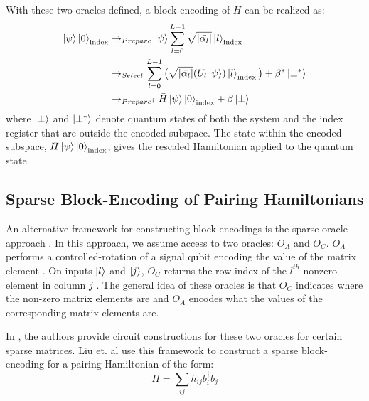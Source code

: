 With these two oracles defined, a block-encoding of $H$ can be realized as:
\begin{equation}
    \begin{split}
        \ket{\psi} \ket{0}_{\text{\text{index}}} &\rightarrow_{Prepare} \ket{\psi} \sum_{l=0}^{L-1} \sqrt{| \bar{\alpha_l} |} \ket{l}_{\text{\text{index}}} \\
        &\rightarrow_{Select} \sum_{l=0}^{L-1} \big(\sqrt{| \bar{\alpha_l} |} (U_l \ket{\psi}) \ket{l}_{\text{\text{index}}} \big) + \beta^* \ket{\perp^*} \\
        &\rightarrow_{Prepare^\dagger}  \bar{H} \ket{\psi} \ket{0}_{\text{\text{index}}} + \beta \ket{\perp} \\
    \end{split}
\end{equation}
where $\ket{\perp}$ and $\ket{\perp^*}$ denote quantum states of both the system and the index register that are outside the encoded subspace.
The state within the encoded subspace, $\bar{H} \ket{\psi} \ket{0}_{\text{\text{index}}}$, gives the rescaled Hamiltonian applied to the quantum state.

\subsection{Sparse Block-Encoding of Pairing Hamiltonians}
\label{subsec:sparse-be}

An alternative framework for constructing block-encodings is the sparse oracle approach \cite{berry2009black, childs2009universal, lin2022lecture}.
In this approach, we assume access to two oracles: $O_A$ and $O_C$.
$O_A$ performs a controlled-rotation of a signal qubit encoding the value of the matrix element \cite{lin2022lecture}.
On inputs $\ket{l}$ and $\ket{j}$, $O_C$ returns the row index of the $l^{th}$ nonzero element in column $j$ \cite{camps2024explicit}.
The general idea of these oracles is that $O_C$ indicates where the non-zero matrix elements are and $O_A$ encodes what the values of the corresponding matrix elements are. 

In \cite{camps2024explicit}, the authors provide circuit constructions for these two oracles for certain sparse matrices.
Liu et. al \cite{liu2024efficient} use this framework to construct a sparse block-encoding for a pairing Hamiltonian of the form:
\begin{equation}
    H = \sum_{ij}h_{ij}b^\dagger_i b_j
\end{equation}


